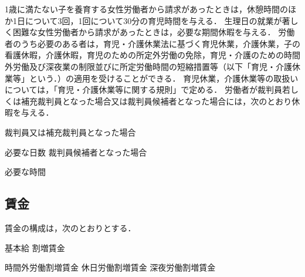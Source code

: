 \documentclass[11pt,a4paper]{jsarticle}
\begin{document}
1歳に満たない子を養育する女性労働者から請求があったときは，休憩時間のほか1日について3回，1回について30分の育児時間を与える．
\term
生理日の就業が著しく困難な女性労働者から請求があったときは，必要な期間休暇を与える．
労働者のうち必要のある者は，育児・介護休業法に基づく育児休業，介護休業，子の看護休暇，介護休暇，育児のための所定外労働の免除，育児・介護のための時間外労働及び深夜業の制限並びに所定労働時間の短縮措置等（以下「育児・介護休業等」という．）の適用を受けることができる．
\term
育児休業，介護休業等の取扱いについては，「育児・介護休業等に関する規則」で定める．
労働者が裁判員若しくは補充裁判員となった場合又は裁判員候補者となった場合には，次のとおり休暇を与える．
\begin{enumerate}
	\itm 裁判員又は補充裁判員となった場合 \par 必要な日数
	\itm 裁判員候補者となった場合\par 必要な時間
\end{enumerate}


\subsection{賃金}
賃金の構成は，次のとおりとする．
\begin{enumerate}
	\itm 基本給
	\itm 割増賃金
	\begin{enumerate}
		\itm 時間外労働割増賃金
		\itm 休日労働割増賃金
		\itm 深夜労働割増賃金
	\end{enumerate}
\end{enumerate}
\end{document}
